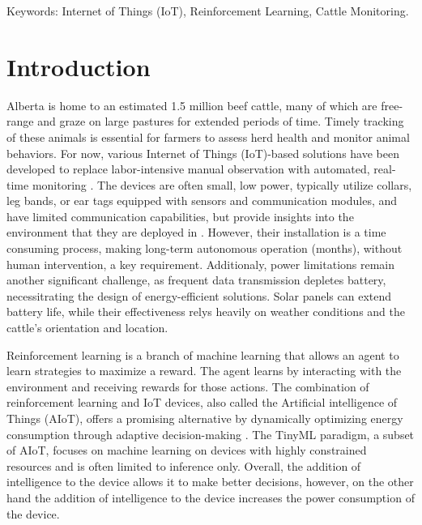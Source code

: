 \documentclass[10pt]{cai}
\begin{document}
\begin{keywords}{Keywords:}
Internet of Things (IoT), Reinforcement Learning, Cattle Monitoring.
\end{keywords}
\copyrightnotice

\section{Introduction}

Alberta is home to an estimated 1.5 million beef cattle, many of which are free-range and graze on large pastures for extended periods of time.
Timely tracking of these animals is essential for farmers to assess herd health and monitor animal behaviors. 
For now, various Internet of Things (IoT)-based solutions have been developed to replace labor-intensive manual observation with automated, real-time monitoring \cite{unoldIoTBasedCowHealth2020}.
The devices are often small, low power, typically utilize collars, leg bands, or ear tags equipped with sensors and communication modules, and have limited communication capabilities, but provide insights into the environment that they are deployed in \cite{unoldIoTBasedCowHealth2020} \cite{moutaouakilDigitalFarmingSurvey2023}.
However, their installation is a time consuming process, making long-term autonomous operation (months), without human intervention, a key requirement.
Additionaly, power limitations remain another significant challenge, as frequent data transmission depletes battery, necessitrating the design of energy-efficient solutions.
Solar panels can extend battery life, while their effectiveness relys heavily on weather conditions and the cattle's orientation and location.

Reinforcement learning is a branch of machine learning that allows an agent to learn strategies to maximize a reward.
The agent learns by interacting with the environment and receiving rewards for those actions.
The combination of reinforcement learning and IoT devices, also called the Artificial intelligence of Things (AIoT)\cite{yamsaniIoTBasedLivestockMonitoring2024}, offers a promising alternative by dynamically optimizing energy consumption through adaptive decision-making \cite{suttonReinforcementLearningIntroduction2020}. 
The TinyML paradigm, a subset of AIoT, focuses on machine learning on devices with highly constrained resources and is often limited to inference only\cite{rayReviewTinyMLStateoftheart2022}.
Overall, the addition of intelligence to the device allows it to make better decisions, however, on the other hand the addition of intelligence to the device increases the power consumption of the device.
\end{document}
